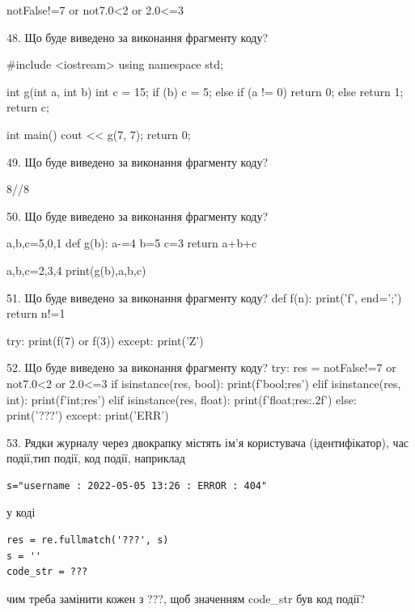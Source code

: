 \documentclass[11pt]{article}
\begin{document}
notFalse!=7 or not7.0<2 or 2.0<=3
\vspace{5mm}

48. Що буде виведено за виконання фрагменту коду?

#include <iostream>
using namespace std;

int g(int a, int b){
    int c = 15;
    if (b)
        c = 5;
    else if (a != 0)
         return 0;
    else 
        return 1;
    return c;
}

int main(){
    cout << g(7, 7);
    return 0;
}
\vspace{5mm}

49. Що буде виведено за виконання фрагменту коду?

8//8%
\vspace{5mm}

50. Що буде виведено за виконання фрагменту коду?

a,b,c=5,0,1
def g(b):
    a-=4
    b=5
    c=3
    return a+b+c

a,b,c=2,3,4
print(g(b),a,b,c)
\vspace{5mm}

51. Що буде виведено за виконання фрагменту коду?
def f(n):
    print('f', end=';')
    return n!=1

try:
    print(f(7) or f(3))
except:
    print('Z')
\vspace{5mm}

52. Що буде виведено за виконання фрагменту коду?
try:
    res = notFalse!=7 or not7.0<2 or 2.0<=3
    if isinstance(res, bool):
        print(f'bool;{res}')
    elif isinstance(res, int):
        print(f'int;{res}')
    elif isinstance(res, float):
        print(f'float;{res:.2f}')
    else:
        print('???')
except:
    print('ERR')
\vspace{5mm}

53. 
Рядки журналу через двокрапку містять ім'я користувача (ідентифікатор), час події,тип події, код події, наприклад
\begin{verbatim}
s="username : 2022-05-05 13:26 : ERROR : 404"
\end{verbatim}
у коді 
\begin{verbatim}
res = re.fullmatch('???', s) 
s = ''
code_str = ??? 
\end{verbatim}
чим треба замінити кожен з ???, щоб значенням code\_str був код події? 


\vspace{5mm}
\end{document}
